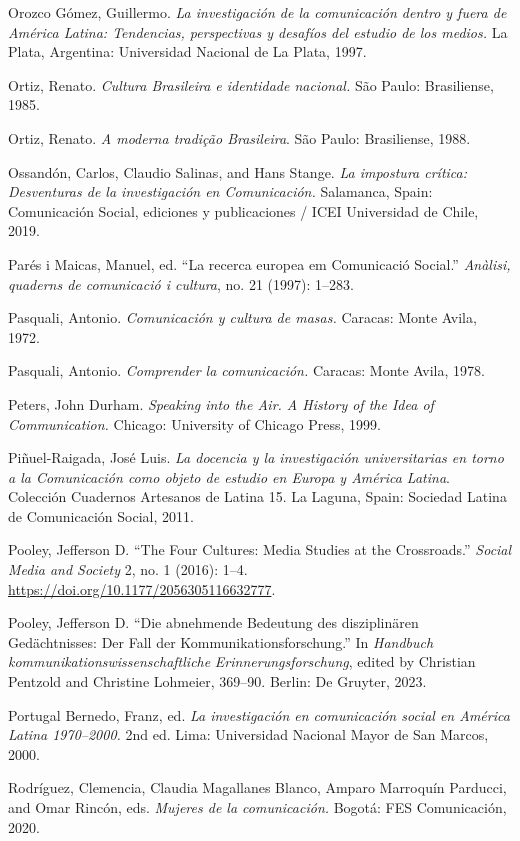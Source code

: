 \documentclass{tufte-handout}
\begin{document}
\begin{hangparas}{.25in}{1}
Orozco Gómez, Guillermo. \emph{La investigación de la comunicación
dentro y fuera de América Latina: Tendencias, perspectivas y desafíos
del estudio de los medios.} La Plata, Argentina: Universidad Nacional de
La Plata, 1997.

Ortiz, Renato. \emph{Cultura Brasileira e identidade nacional.} São
Paulo: Brasiliense, 1985.

Ortiz, Renato. \emph{A moderna tradição Brasileira}. São Paulo:
Brasiliense, 1988.

Ossandón, Carlos, Claudio Salinas, and Hans Stange. \emph{La impostura
crítica: Desventuras de la investigación en Comunicación.} Salamanca,
Spain: Comunicación Social, ediciones y publicaciones / ICEI Universidad
de Chile, 2019.

Parés i Maicas, Manuel, ed. ``La recerca europea em Comunicació
Social.'' \emph{Anàlisi, quaderns de comunicació i cultura}, no. 21
(1997): 1--283.

Pasquali, Antonio. \emph{Comunicación y cultura de masas.} Caracas:
Monte Avila, 1972.

Pasquali, Antonio. \emph{Comprender la comunicación.} Caracas: Monte
Avila, 1978.

Peters, John Durham. \emph{Speaking into the Air. A History of the Idea
of Communication.} Chicago: University of Chicago Press, 1999.

Piñuel-Raigada, José Luis. \emph{La docencia y la investigación
universitarias en torno a la Comunicación como objeto de estudio en
Europa y América Latina}. Colección Cuadernos Artesanos de Latina 15. La
Laguna, Spain: Sociedad Latina de Comunicación Social, 2011.

Pooley, Jefferson D. ``The Four Cultures: Media Studies at the
Crossroads.'' \emph{Social Media and Society} 2, no. 1 (2016): 1--4.
\url{https://doi.org/10.1177/2056305116632777}.

Pooley, Jefferson D. ``Die abnehmende Bedeutung des disziplinären
Gedächtnisses: Der Fall der Kommunikationsforschung.'' In
\emph{Handbuch} \emph{kommunikationswissenschaftliche}
\emph{Erinnerungsforschung}, edited by Christian Pentzold and Christine
Lohmeier, 369--90. Berlin: De Gruyter, 2023.

Portugal Bernedo, Franz, ed. \emph{La investigación en comunicación
social en América Latina 1970--2000.} 2nd ed. Lima: Universidad Nacional
Mayor de San Marcos, 2000.

Rodríguez, Clemencia, Claudia Magallanes Blanco, Amparo Marroquín
Parducci, and Omar Rincón, eds. \emph{Mujeres de la comunicación.}
Bogotá: FES Comunicación, 2020.


\end{hangparas}
\end{document}
